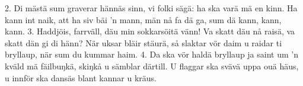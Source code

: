 2.  Di mästä sum graverar hännäs sinn,
    vi folki sägä: ha ska varä mä en kinn.
    Ha kann int naik, att ha siv bäi 'n mann,
    män nå fa dä ga, sum dä kann, kann, kann.
3.  Haddjöis, farrväll, däu min sokkarsöitä vänn!
    Va skatt däu nå raisä, va skatt dän gi di hänn?
    När uksar bläir stäurä, så slaktar vör daim
    u raidar ti bryllaup, när sum du kummar haim.
4.  Da ska vör haldä bryllaup ja saint um ’n kväld
    mä fäilbuŋkä, skiŋkå u sämblar därtill.
    U flaggar ska svävä uppa ouä häus,
    u innför ska dansäs blant kannar u kräus.
